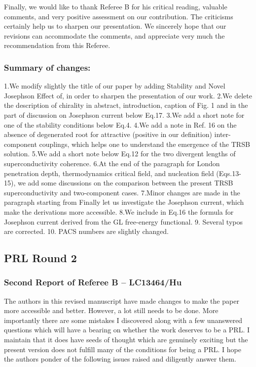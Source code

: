 \documentclass[11pt]{article}
\begin{document}
Finally, we would like to thank Referee B for his critical reading,
valuable comments, and very positive assessment on our contribution. The
criticisms certainly help us to sharpen our presentation. We sincerely
hope that our revisions can accommodate the comments, and appreciate
very much the recommendation from this Referee.

\hypertarget{summary-of-changes}{%
\subsubsection{Summary of changes:}\label{summary-of-changes}}

1.We modify slightly the title of our paper by adding Stability and
Novel Josephson Effect of, in order to sharpen the presentation of our
work. 2.We delete the description of chirality in abstract,
introduction, caption of Fig. 1 and in the part of discussion on
Josephson current below Eq.17. 3.We add a short note for one of the
stability conditions below Eq.4. 4.We add a note in Ref. 16 on the
absence of degenerated root for attractive (positive in our definition)
inter-component couplings, which helps one to understand the emergence
of the TRSB solution. 5.We add a short note below Eq.12 for the two
divergent lengths of superconductivity coherence. 6.At the end of the
paragraph for London penetration depth, thermodynamics critical field,
and nucleation field (Eqs.13-15), we add some discussions on the
comparison between the present TRSB superconductivity and two-component
cases. 7.Minor changes are made in the paragraph starting from Finally
let us investigate the Josephson current, which make the derivations
more accessible. 8.We include in Eq.16 the formula for Josephson current
derived from the GL free-energy functional. 9. Several typos are
corrected. 10. PACS numbers are slightly changed.

\hypertarget{prl-round-2}{%
\subsection{PRL Round 2}\label{prl-round-2}}

\hypertarget{second-report-of-referee-b-lc13464hu}{%
\subsubsection{Second Report of Referee B --
LC13464/Hu}\label{second-report-of-referee-b-lc13464hu}}

The authors in this revised manuscript have made changes to make the
paper more accessible and better. However, a lot still needs to be done.
More importantly there are some mistakes I discovered along with a few
unanswered questions which will have a bearing on whether the work
deserves to be a PRL. I maintain that it does have seeds of thought
which are genuinely exciting but the present version does not fulfill
many of the conditions for being a PRL. I hope the authors ponder of the
following issues raised and diligently answer them.
\end{document}
